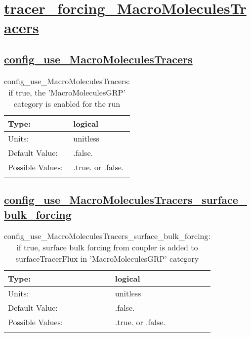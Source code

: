 \section[tracer\_forcing\_MacroMoleculesTracers]{\hyperref[sec:nm_tab_tracer_forcing_MacroMoleculesTracers]{tracer\_forcing\_MacroMoleculesTracers}}
\label{sec:nm_sec_tracer_forcing_MacroMoleculesTracers}
\subsection[config\_use\_MacroMoleculesTracers]{\hyperref[sec:nm_tab_tracer_forcing_MacroMoleculesTracers]{config\_use\_MacroMoleculesTracers}}
\label{subsec:nm_sec_config_use_MacroMoleculesTracers}
\begin{center}
\begin{longtable}{| p{2.0in} || p{4.0in} |}
    \hline
    Type: & logical \\
    \hline
    Units: & \si{unitless} \\
    \hline
    Default Value: & .false. \\
    \hline
    Possible Values: & .true. or .false. \\
    \hline
    \caption{config\_use\_MacroMoleculesTracers: if true, the 'MacroMoleculesGRP' category is enabled for the run}
\end{longtable}
\end{center}
\subsection[config\_use\_MacroMoleculesTracers\_surface\_bulk\_forcing]{\hyperref[sec:nm_tab_tracer_forcing_MacroMoleculesTracers]{config\_use\_MacroMoleculesTracers\_surface\_bulk\_forcing}}
\label{subsec:nm_sec_config_use_MacroMoleculesTracers_surface_bulk_forcing}
\begin{center}
\begin{longtable}{| p{2.0in} || p{4.0in} |}
    \hline
    Type: & logical \\
    \hline
    Units: & \si{unitless} \\
    \hline
    Default Value: & .false. \\
    \hline
    Possible Values: & .true. or .false. \\
    \hline
    \caption{config\_use\_MacroMoleculesTracers\_surface\_bulk\_forcing: if true, surface bulk forcing from coupler is added to surfaceTracerFlux in 'MacroMoleculesGRP' category}
\end{longtable}
\end{center}
